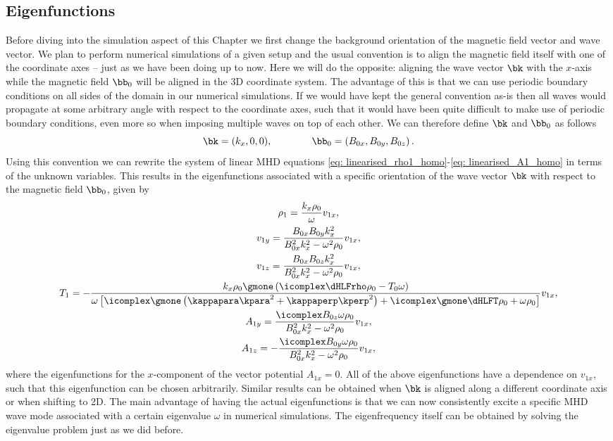 \subsection{Eigenfunctions}
Before diving into the simulation aspect of this Chapter we first change the background orientation of the magnetic field vector and wave vector. We plan to perform numerical simulations of a given setup and the usual convention is to align the magnetic field itself with one of the coordinate axes -- just as we have been doing up to now. Here we will do the opposite: aligning the wave vector $\bk$ with the $x$-axis while the magnetic field $\bb_0$ will be aligned in the 3D coordinate system. The advantage of this is that we can use periodic boundary conditions on all sides of the domain in our numerical simulations. If we would have kept the general convention as-is then all waves would propagate at some arbitrary angle with respect to the coordinate axes, such that it would have been quite difficult to make use of periodic boundary conditions, even more so when imposing multiple waves on top of each other. We can therefore define $\bk$ and $\bb_0$ as follows
\begin{equation}
  \bk = (k_x, 0, 0), \qquad\qquad \bb_0 = \left(B_{0x}, B_{0y}, B_{0z}\right).
\end{equation}
Using this convention we can rewrite the system of linear MHD equations \eqref{eq: linearised_rho1_homo}-\eqref{eq: linearised_A1_homo} in terms of the unknown variables. This results in the eigenfunctions associated with a specific orientation of the wave vector $\bk$ with respect to the magnetic field $\bb_0$, given by
\begin{gather}
  \rho_1 = \frac{k_x \rho_0}{\omega}v_{1x}, \label{eq: rho1_eigenfunction}\\
  v_{1y} = \frac{B_{0x}B_{0y}k_x^2}{B_{0x}^2k_x^2 - \omega^2\rho_0}v_{1x}, \\
  v_{1z} = \frac{B_{0x}B_{0z}k_x^2}{B_{0x}^2k_x^2 - \omega^2\rho_0}v_{1x}, \\
  T_1 = -\frac{k_x \rho_0 \gmone \left(\icomplex\dHLFrho\rho_0 - T_0 \omega\right)}{
    \omega\left[
      \icomplex\gmone\left(\kappapara\kpara^2 + \kappaperp\kperp^2\right)
      + \icomplex\gmone \dHLFT \rho_0
      + \omega \rho_0
    \right]
  }v_{1x}, \\
  A_{1y} = \frac{\icomplex B_{0z}\omega \rho_0}{B_{0x}^2k_x^2 - \omega^2\rho_0}v_{1x}, \\
  A_{1z} = -\frac{\icomplex B_{0y}\omega \rho_0}{B_{0x}^2k_x^2 - \omega^2\rho_0}v_{1x}, \label{eq: A1Z_eigenfunction}
\end{gather}
where the eigenfunctions for the $x$-component of the vector potential $A_{1x} = 0$. All of the above eigenfunctions have a dependence on $v_{1x}$, such that this eigenfunction can be chosen arbitrarily. Similar results can be obtained when $\bk$ is aligned along a different coordinate axis or when shifting to 2D. The main advantage of having the actual eigenfunctions is that we can now consistently excite a specific MHD wave mode associated with a certain eigenvalue $\omega$ in numerical simulations. The eigenfrequency itself can be obtained by solving the eigenvalue problem just as we did before.

